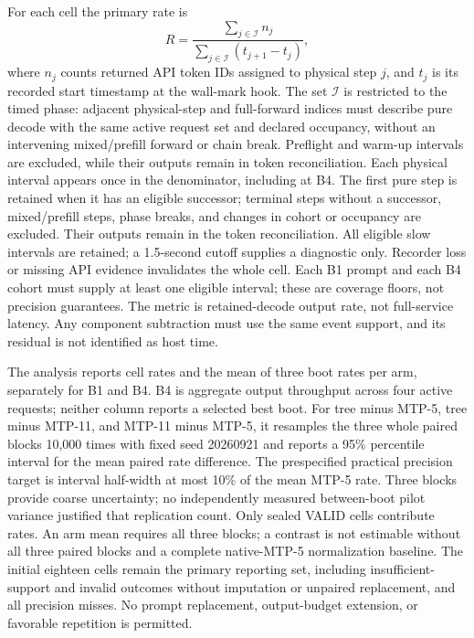 \documentclass[conference]{IEEEtran}
\begin{document}
For each cell the primary rate is
\begin{equation}
 R = \frac{\sum_{j\in\mathcal{I}} n_j}
 {\sum_{j\in\mathcal{I}}(t_{j+1}-t_j)},
\end{equation}
where $n_j$ counts returned API token IDs assigned to physical step $j$, and $t_j$ is its recorded start timestamp at the wall-mark hook. The set $\mathcal{I}$ is restricted to the timed phase: adjacent physical-step and full-forward indices must describe pure decode with the same active request set and declared occupancy, without an intervening mixed/prefill forward or chain break. Preflight and warm-up intervals are excluded, while their outputs remain in token reconciliation. Each physical interval appears once in the denominator, including at B4. The first pure step is retained when it has an eligible successor; terminal steps without a successor, mixed/prefill steps, phase breaks, and changes in cohort or occupancy are excluded. Their outputs remain in the token reconciliation. All eligible slow intervals are retained; a 1.5-second cutoff supplies a diagnostic only. Recorder loss or missing API evidence invalidates the whole cell. Each B1 prompt and each B4 cohort must supply at least one eligible interval; these are coverage floors, not precision guarantees. The metric is retained-decode output rate, not full-service latency. Any component subtraction must use the same event support, and its residual is not identified as host time.

The analysis reports cell rates and the mean of three boot rates per arm, separately for B1 and B4. B4 is aggregate output throughput across four active requests; neither column reports a selected best boot. For tree minus MTP-5, tree minus MTP-11, and MTP-11 minus MTP-5, it resamples the three whole paired blocks 10,000 times with fixed seed 20260921 and reports a 95\% percentile interval for the mean paired rate difference. The prespecified practical precision target is interval half-width at most 10\% of the mean MTP-5 rate. Three blocks provide coarse uncertainty; no independently measured between-boot pilot variance justified that replication count. Only sealed VALID cells contribute rates. An arm mean requires all three blocks; a contrast is not estimable without all three paired blocks and a complete native-MTP-5 normalization baseline. The initial eighteen cells remain the primary reporting set, including insufficient-support and invalid outcomes without imputation or unpaired replacement, and all precision misses. No prompt replacement, output-budget extension, or favorable repetition is permitted.
\end{document}
